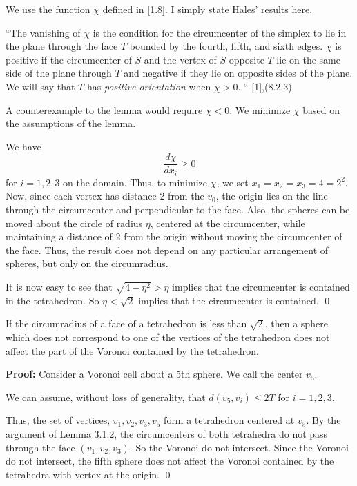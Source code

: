 We use the function $\chi$ defined in [1.8]. 
I simply state Hales' results here.

``The vanishing of $\chi$ is the condition for the
circumcenter of the simplex to lie
in the plane through the face $T$
bounded by the fourth,
fifth, and sixth edges.  $\chi$ is positive if the circumcenter of
$S$ and the vertex of $S$ opposite $T$ lie on the same side of the
plane through $T$ and negative if they lie on opposite sides
of the plane.  We will say that $T$ has {\it positive orientation\/}
when $\chi>0$. `` [1],(8.2.3)

A counterexample to the lemma would require $\chi < 0$.  We minimize $\chi$ based on the 
assumptions of the lemma.

We have $$\frac {d\chi}{dx_i}\geq 0$$ for $i=1,2,3$ on the domain.  Thus, to minimize $\chi$,
 we set $x_1=x_2=x_3=4=2^2$.  Now, since each vertex has distance 2 from the $v_0$, 
the origin lies on the line through the circumcenter and perpendicular to the face.  
Also, the spheres can be moved about the circle of radius $\eta$, centered at the circumcenter,
 while maintaining a distance of 2 from the origin without moving the circumcenter of the face. 
 Thus, the result does not depend on any particular arrangement of spheres, but only on the 
circumradius.  

It is now easy to see that $\sqrt{4-\eta^2} > \eta$ implies that the circumcenter is
 contained in the tetrahedron.  So $\eta < \sqrt 2$ implies that the circumcenter is 
contained.  \qed

 If the circumradius of a face of a tetrahedron is less than $\sqrt 2$,
 then a sphere which does not correspond to one of the vertices of the tetrahedron does not 
affect the part of the Voronoi contained by the tetrahedron. \endproclaim

{\bf Proof:} Consider a Voronoi cell about a 5th sphere.  We call the center $v_5$.  

We can assume, without loss of generality, that $d(v_5,v_i)\le 2T$ for $i=1,2,3$. 

Thus, the set of vertices, $v_1,v_2,v_3,v_5$ form a tetrahedron centered at $v_5$.  
By the argument of Lemma 3.1.2, the circumcenters of both tetrahedra do not pass through the face $(v_1,v_2,v_3)$.  So the Voronoi do not intersect.  Since the Voronoi do not intersect, the fifth sphere does not affect the 
Voronoi contained by the tetrahedra with vertex at the origin.  \qed

\bigskip

